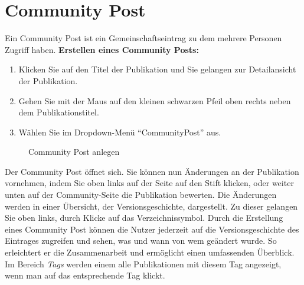 \section{Community Post}
\label{sec:communityPost}
Ein Community Post ist ein Gemeinschaftseintrag zu dem mehrere Personen Zugriff haben. \newline \newline
\textbf{Erstellen eines Community Posts:}
\begin{enumerate}
	\item Klicken Sie auf den Titel der Publikation und Sie gelangen zur Detailansicht der Publikation. 
	\item Gehen Sie mit der Maus auf den kleinen schwarzen Pfeil oben rechts neben dem Publikationstitel. 
	\item Wählen Sie im Dropdown-Menü \enquote{CommunityPost} aus. \end{enumerate}
\begin{figure}[h!]
 \centering
 \caption{Community Post anlegen}
 \label{fig:communityPostAnlegen}
\end{figure}
Der Community Post öffnet sich. Sie können nun Änderungen an der Publikation vornehmen, indem Sie oben links auf der Seite auf den Stift klicken, oder weiter unten auf der Community-Seite die Publikation bewerten. Die Änderungen werden in einer Übersicht, der Versionsgeschichte, dargestellt. Zu dieser gelangen Sie oben links, durch Klicke auf das Verzeichnissymbol.\newline
Durch die Erstellung eines Community Post können die Nutzer jederzeit auf die Versionsgeschichte des Eintrages zugreifen und sehen, was und wann von wem geändert wurde. So erleichtert er die Zusammenarbeit und ermöglicht einen umfassenden Überblick. \newline
Im Bereich \textit{Tags} werden einem alle Publikationen mit diesem Tag angezeigt, wenn man auf das entsprechende Tag klickt. \newline
